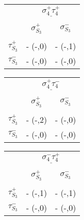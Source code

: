 \documentclass[12pt]{article}
\begin{document}
\begin{center}
\hspace{-1cm}\begin{tabular}{ c | c | c |}
\multicolumn{1}{c}{} &\multicolumn{2}{c}{$\underline{\sigma_4^+ \tau_4^+}$} \\[-1em]
\multicolumn{1}{c}{} & \multicolumn{1}{c}{} & \multicolumn{1}{c}{} \\
\multicolumn{1}{c}{} & \multicolumn{1}{c}{$\sigma_{S_3}^+$} & \multicolumn{1}{c}{$\sigma_{S_3}^-$} \\[-1em]
\multicolumn{1}{c}{} & \multicolumn{1}{c}{} & \multicolumn{1}{c}{} \\
\cline{2-3} $\tau_{S_3}^+$ & - (-,0) & - (-,1) \\
\cline{2-3} $\tau_{S_3}^-$ & - (-,0) & - (-,0) \\
\cline{2-3}
\end{tabular} 
\hspace{.4cm}
\begin{tabular}{ c | c | c |}
\multicolumn{1}{c}{} &\multicolumn{2}{c}{$\underline{\sigma_4^+ \tau_4^-}$} \\[-1em]
\multicolumn{1}{c}{} & \multicolumn{1}{c}{} & \multicolumn{1}{c}{}\\
\multicolumn{1}{c}{} & \multicolumn{1}{c}{$\sigma_{S_3}^+$} & \multicolumn{1}{c}{$\sigma_{S_3}^-$} \\[-1em]
\multicolumn{1}{c}{} & \multicolumn{1}{c}{} & \multicolumn{1}{c}{} \\
\cline{2-3} $\tau_{S_3}^+$ & - (-,2) & - (-,0) \\
\cline{2-3} $\tau_{S_3}^-$ & - (-,0) & - (-,0) \\
\cline{2-3}
\end{tabular}
\hspace{.4cm}
\begin{tabular}{ c | c | c |}
\multicolumn{1}{c}{} &\multicolumn{2}{c}{$\underline{\sigma_4^- \tau_4^+}$} \\[-1em]
\multicolumn{1}{c}{} & \multicolumn{1}{c}{} & \multicolumn{1}{c}{}\\
\multicolumn{1}{c}{} & \multicolumn{1}{c}{$\sigma_{S_3}^+$} & \multicolumn{1}{c}{$\sigma_{S_3}^-$} \\[-1em]
\multicolumn{1}{c}{} & \multicolumn{1}{c}{} & \multicolumn{1}{c}{} \\
\cline{2-3} $\tau_{S_3}^+$ & - (-,1) & - (-,1) \\
\cline{2-3} $\tau_{S_3}^-$ & - (-,0) & - (-,0) \\
\cline{2-3}
\end{tabular}
\hspace{.4cm}

\end{center}
\end{document}
